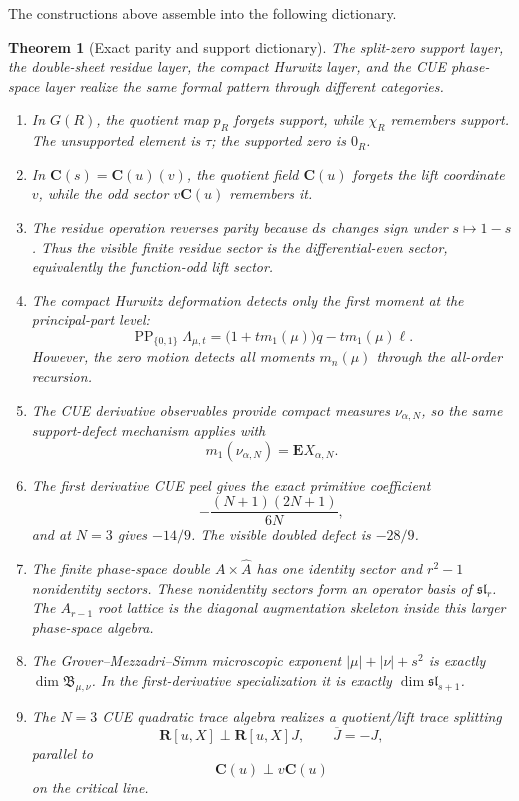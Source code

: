 \documentclass[11pt]{article}
\newcommand{\C}{\mathbf C}
\newcommand{\R}{\mathbf R}
\newcommand{\PP}{\operatorname{PP}}
\theoremstyle{plain}
\newtheorem{theorem}{Theorem}[section]
\theoremstyle{definition}
\begin{document}
The constructions above assemble into the following dictionary.

\begin{theorem}[Exact parity and support dictionary]\label{thm:dictionary}
The split-zero support layer, the double-sheet residue layer, the compact Hurwitz layer, and the CUE phase-space layer realize the same formal pattern through different categories.
\begin{enumerate}[label=\textup{(\arabic*)}]
\item In \(G(R)\), the quotient map \(p_R\) forgets support, while \(\chi_R\) remembers support.  The unsupported element is \(\tau\); the supported zero is \(0_R\).
\item In \(\C(s)=\C(u)(v)\), the quotient field \(\C(u)\) forgets the lift coordinate \(v\), while the odd sector \(v\C(u)\) remembers it.
\item The residue operation reverses parity because \(ds\) changes sign under \(s\mapsto1-s\).  Thus the visible finite residue sector is the differential-even sector, equivalently the function-odd lift sector.
\item The compact Hurwitz deformation detects only the first moment at the principal-part level:
\[
   \PP_{\{0,1\}}\Lambda_{\mu,t}
   =\bigl(1+tm_1(\mu)\bigr)q-tm_1(\mu)\ell.
\]
However, the zero motion detects all moments \(m_n(\mu)\) through the all-order recursion.
\item The CUE derivative observables provide compact measures \(\nu_{\alpha,N}\), so the same support-defect mechanism applies with
\[
   m_1(\nu_{\alpha,N})=\mathbf E X_{\alpha,N}.
\]
\item The first derivative CUE peel gives the exact primitive coefficient
\[
   -\frac{(N+1)(2N+1)}{6N},
\]
and at \(N=3\) gives \(-14/9\).  The visible doubled defect is \(-28/9\).
\item The finite phase-space double \(A\times\widehat A\) has one identity sector and \(r^2-1\) nonidentity sectors.  These nonidentity sectors form an operator basis of \(\mathfrak{sl}_r\).  The \(A_{r-1}\) root lattice is the diagonal augmentation skeleton inside this larger phase-space algebra.
\item The Grover--Mezzadri--Simm microscopic exponent \(|\mu|+|\nu|+s^2\) is exactly \(\dim\mathfrak B_{\mu,\nu}\).  In the first-derivative specialization it is exactly \(\dim\mathfrak{sl}_{s+1}\).
\item The \(N=3\) CUE quadratic trace algebra realizes a quotient/lift trace splitting
\[
   \R[u,X]\perp \R[u,X]J,
   \qquad
   \overline J=-J,
\]
parallel to
\[
   \C(u)\perp v\C(u)
\]
on the critical line.
\end{enumerate}
\end{theorem}
\end{document}
